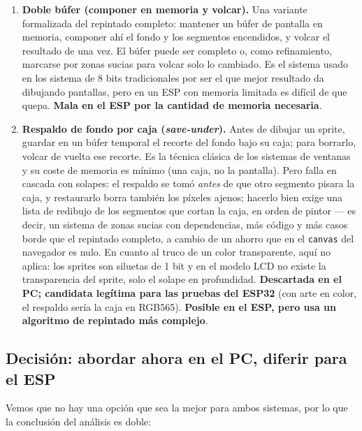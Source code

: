\begin{enumerate}
	\item \textbf{Doble búfer (componer en memoria y volcar).} Una variante formalizada del repintado completo: mantener un búfer de pantalla en memoria, componer ahí el fondo y los segmentos encendidos, y volcar el resultado de una vez. El búfer puede ser completo o, como refinamiento, marcarse por zonas sucias para volcar solo lo cambiado. Es el sistema usado en los sistema de 8 bits tradicionales por ser el que mejor resultado da dibujando pantallas, pero en un ESP con memoria limitada es difícil de que quepa. \textbf{Mala en el ESP por la cantidad de memoria necesaria}.
	
	\item \textbf{Respaldo de fondo por caja (\textit{save-under}).} Antes de dibujar un sprite, guardar en un búfer temporal el recorte del fondo bajo su caja; para borrarlo, volcar de vuelta ese recorte. Es la técnica clásica de los sistemas de ventanas y su coste de memoria es mínimo (una caja, no la pantalla). Pero falla en cascada con solapes: el respaldo se tomó \emph{antes} de que otro segmento pisara la caja, y restaurarlo borra también los píxeles ajenos; hacerlo bien exige una lista de redibujo de los segmentos que cortan la caja, en orden de pintor --- es decir, un sistema de zonas sucias con dependencias, más código y más casos borde que el repintado completo, a cambio de un ahorro que en el \texttt{canvas} del navegador es nulo. En cuanto al truco de un color transparente, aquí no aplica: los sprites son siluetas de 1 bit y en el modelo LCD no existe la transparencia del sprite, solo el solape en profundidad. \textbf{Descartada en el PC; candidata legítima para las pruebas del ESP32} (con arte en color, el respaldo sería la caja en RGB565). \textbf{Posible en el ESP, pero usa un algoritmo de repintado más complejo}.
	
\end{enumerate}

\subsection{Decisión: abordar ahora en el PC, diferir para el ESP}
\label{subsec:DecisionDobleVia}

Vemos que no hay una opción que sea la mejor para ambos sistemas, por lo que la conclusión del análisis es doble:

